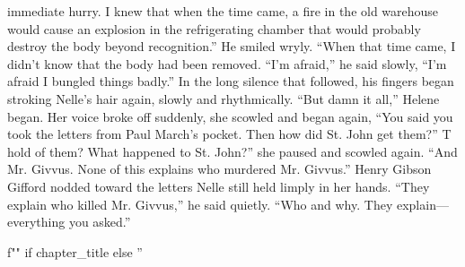 \documentclass{novel}
\begin{document}
immediate hurry. I knew that when the time came, a fire in the old warehouse would cause an explosion in the refrigerating chamber that would probably destroy the body beyond recognition.” He smiled wryly. “When that time came, I didn’t know that the body had been removed. “I’m afraid,” he said slowly, “I’m afraid I bungled things badly.” In the long silence that followed, his fingers began stroking Nelle’s hair again, slowly and rhythmically. “But damn it all,” Helene began. Her voice broke off suddenly, she scowled and began again, “You said you took the letters from Paul March’s pocket. Then how did St. John get them?” T hold of them? What happened to St. John?” she paused and scowled again. “And Mr. Givvus. None of this explains who murdered Mr. Givvus.” Henry Gibson Gifford nodded toward the letters Nelle still held limply in her hands. “They explain who killed Mr. Givvus,” he said quietly. “Who and why. They explain—everything you asked.”

\begin{ChapterStart}
\vspace{3\nbs}
f"" if chapter_title else ''
\end{ChapterStart}
\end{document}
